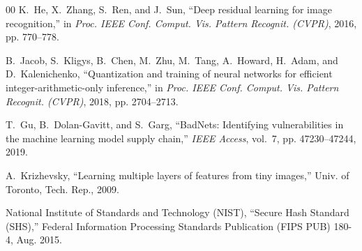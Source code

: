 \documentclass[conference,10pt]{IEEEtran}
\begin{document}
\begin{thebibliography}{00}
K.~He, X.~Zhang, S.~Ren, and J.~Sun, ``Deep residual learning for image recognition,'' in \textit{Proc. IEEE Conf. Comput. Vis. Pattern Recognit. (CVPR)}, 2016, pp. 770--778.

B.~Jacob, S.~Kligys, B.~Chen, M.~Zhu, M.~Tang, A.~Howard, H.~Adam, and D.~Kalenichenko, ``Quantization and training of neural networks for efficient integer-arithmetic-only inference,'' in \textit{Proc. IEEE Conf. Comput. Vis. Pattern Recognit. (CVPR)}, 2018, pp. 2704--2713.

T.~Gu, B.~Dolan-Gavitt, and S.~Garg, ``BadNets: Identifying vulnerabilities in the machine learning model supply chain,'' \textit{IEEE Access}, vol.~7, pp. 47230--47244, 2019.

A.~Krizhevsky, ``Learning multiple layers of features from tiny images,'' Univ. of Toronto, Tech. Rep., 2009.



National Institute of Standards and Technology (NIST), ``Secure Hash Standard (SHS),'' Federal Information Processing Standards Publication (FIPS PUB) 180-4, Aug. 2015.

\end{thebibliography}
\end{document}
